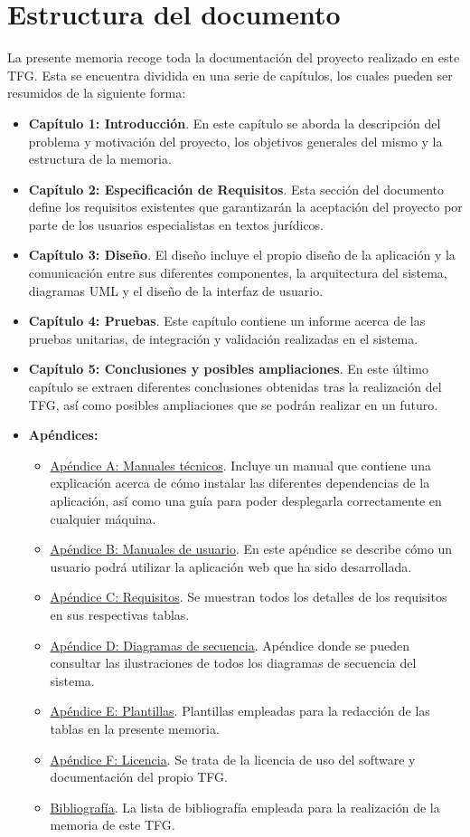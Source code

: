 \section{Estructura del documento}
La presente memoria recoge toda la documentación del proyecto realizado en este TFG. Esta se encuentra dividida en una serie de capítulos, los cuales pueden ser resumidos de la siguiente forma:
\begin{itemize}
\item {\bf Capítulo 1: Introducción}. En este capítulo se aborda la descripción del problema y motivación del proyecto, los objetivos generales del mismo y la estructura de la memoria.
\item {\bf Capítulo 2: Especificación de Requisitos}. Esta sección del documento define los requisitos existentes que garantizarán la aceptación del proyecto por parte de los usuarios especialistas en textos jurídicos.
\item {\bf Capítulo 3: Diseño}. El diseño incluye el propio diseño de la aplicación y la comunicación entre sus diferentes componentes, la arquitectura del sistema, diagramas UML y el diseño de la interfaz de usuario.
\item {\bf Capítulo 4: Pruebas}. Este capítulo contiene un informe acerca de las pruebas unitarias, de integración y validación realizadas en el sistema.
\item {\bf Capítulo 5: Conclusiones y posibles ampliaciones}. En este último capítulo se extraen diferentes conclusiones obtenidas tras la realización del TFG, así como posibles ampliaciones que se podrán realizar en un futuro.
\item {\bf Apéndices:}
\begin{itemize}
\item \underline{Apéndice A: Manuales técnicos}. Incluye un manual que contiene una explicación acerca de cómo instalar las diferentes dependencias de la aplicación, así como una guía para poder desplegarla correctamente en cualquier máquina.
\item \underline{Apéndice B: Manuales de usuario}. En este apéndice se describe cómo un usuario podrá utilizar la aplicación web que ha sido desarrollada.
\item \underline{Apéndice C: Requisitos}. Se muestran todos los detalles de los requisitos en sus respectivas tablas.
\item \underline{Apéndice D: Diagramas de secuencia}. Apéndice donde se pueden consultar las ilustraciones de todos los diagramas de secuencia del sistema.
\item \underline{Apéndice E: Plantillas}. Plantillas empleadas para la redacción de las tablas en la presente memoria.
\item \underline{Apéndice F: Licencia}. Se trata de la licencia de uso del software y documentación del propio TFG.
\item \underline{Bibliografía}. La lista de bibliografía empleada para la realización de la memoria de este TFG.
\end{itemize}
\end{itemize}